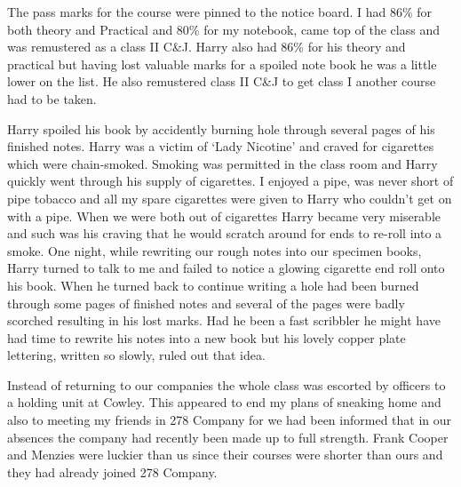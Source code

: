 The pass marks for the course were pinned to the notice board. I had
86\% for both theory and Practical and 80\% for my notebook, came top
of the class and was remustered as a class II C\&J. Harry also had
86\% for his theory and practical but having lost valuable marks for
a spoiled note book he was a little lower on the list. He also
remustered class II C\&J to get class I another course had to be taken.

Harry spoiled his book by accidently burning hole through several
pages of his finished notes. Harry was a victim of `Lady Nicotine' and
craved for cigarettes which were chain-smoked. Smoking was permitted
in the class room and Harry quickly went through his supply of
cigarettes. I enjoyed a pipe, was never short of pipe tobacco and all
my spare cigarettes were given to Harry who couldn't get on with a
pipe. When we were both out of cigarettes Harry became very miserable
and such was his craving that he would scratch around for ends to
re-roll into a smoke. One night, while rewriting our rough notes into
our specimen books, Harry turned to talk to me and failed to notice a
glowing cigarette end roll onto his book. When he turned back to
continue writing a hole had been burned through some pages of finished
notes and several of the pages were badly scorched resulting in his
lost marks. Had he been a fast scribbler he might have had time to
rewrite his notes into a new book but his lovely copper plate
lettering, written so slowly, ruled out that idea.

Instead of returning to our companies the whole class was escorted by
officers to a holding unit at Cowley. This appeared to end my plans of
sneaking home and also to meeting my friends in 278 Company for we had
been informed that in our absences the company had recently been made
up to full strength. Frank Cooper and Menzies were luckier than us
since their courses were shorter than ours and they had already joined
278 Company.
